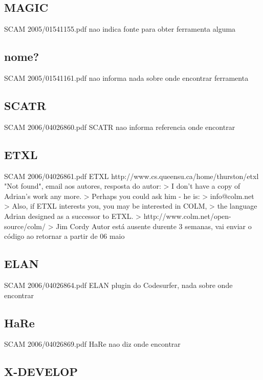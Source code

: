 \subsection{MAGIC}

SCAM 2005/01541155.pdf
 nao indica fonte para obter ferramenta alguma

\subsection{nome?}

SCAM 2005/01541161.pdf
 nao informa nada sobre onde encontrar ferramenta

\subsection{SCATR}

SCAM 2006/04026860.pdf SCATR
 nao informa referencia onde encontrar

\subsection{ETXL}

SCAM 2006/04026861.pdf ETXL
 http://www.cs.queensu.ca/home/thurston/etxl "Not found", email aos autores,
 resposta do autor:
 > I don’t have a copy of Adrian’s work any more.
 > Perhaps you could ask him - he is:
 > 	info@colm.net
 > Also, if ETXL interests you, you may be interested in COLM,
 > the language Adrian designed as a successor to ETXL.
 > 	http://www.colm.net/open-source/colm/
 > Jim Cordy
 Autor está ausente durente 3 semanas, vai enviar o código ao retornar a partir
 de 06 maio

\subsection{ELAN}

SCAM 2006/04026864.pdf ELAN
 plugin do Codesurfer, nada sobre onde encontrar

\subsection{HaRe}

SCAM 2006/04026869.pdf HaRe
 nao diz onde encontrar

\subsection{X-DEVELOP}

